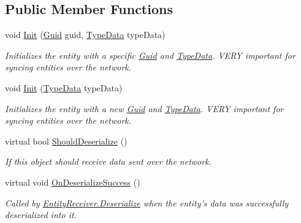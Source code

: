 \subsection*{Public Member Functions}
\begin{DoxyCompactItemize}
\item 
void \hyperlink{class_skyrates_1_1_common_1_1_entity_1_1_entity_a5cacb91a3691f5a6c4b3087c98f402f9}{Init} (\hyperlink{class_skyrates_1_1_common_1_1_entity_1_1_entity_ae32af79e6a33bed16aeb0455078885c8}{Guid} guid, \hyperlink{class_skyrates_1_1_common_1_1_entity_1_1_entity_1_1_type_data}{Type\-Data} type\-Data)
\begin{DoxyCompactList}\small\item\em Initializes the entity with a specific \hyperlink{class_skyrates_1_1_common_1_1_entity_1_1_entity_ae32af79e6a33bed16aeb0455078885c8}{Guid} and \hyperlink{class_skyrates_1_1_common_1_1_entity_1_1_entity_1_1_type_data}{Type\-Data}. V\-E\-R\-Y important for syncing entities over the network. \end{DoxyCompactList}\item 
void \hyperlink{class_skyrates_1_1_common_1_1_entity_1_1_entity_a1e1f4bba9e46f3753dda54a9db711a06}{Init} (\hyperlink{class_skyrates_1_1_common_1_1_entity_1_1_entity_1_1_type_data}{Type\-Data} type\-Data)
\begin{DoxyCompactList}\small\item\em Initializes the entity with a new \hyperlink{class_skyrates_1_1_common_1_1_entity_1_1_entity_ae32af79e6a33bed16aeb0455078885c8}{Guid} and \hyperlink{class_skyrates_1_1_common_1_1_entity_1_1_entity_1_1_type_data}{Type\-Data}. V\-E\-R\-Y important for syncing entities over the network. \end{DoxyCompactList}\item 
virtual bool \hyperlink{class_skyrates_1_1_common_1_1_entity_1_1_entity_aa207bcb5c4e7ac19983bee537dfee751}{Should\-Deserialize} ()
\begin{DoxyCompactList}\small\item\em If this object should receive data sent over the network. \end{DoxyCompactList}\item 
virtual void \hyperlink{class_skyrates_1_1_common_1_1_entity_1_1_entity_aa5a53dfb527054cd23f69bc8750f59e0}{On\-Deserialize\-Success} ()
\begin{DoxyCompactList}\small\item\em Called by \hyperlink{class_skyrates_1_1_common_1_1_entity_1_1_entity_receiver_a9da0b7c3a8b9e1ed7d10be74ce80482b}{Entity\-Receiver.\-Deserialize} when the entity's data was successfully deserialized into it. \end{DoxyCompactList}\item 

\end{DoxyCompactItemize}
